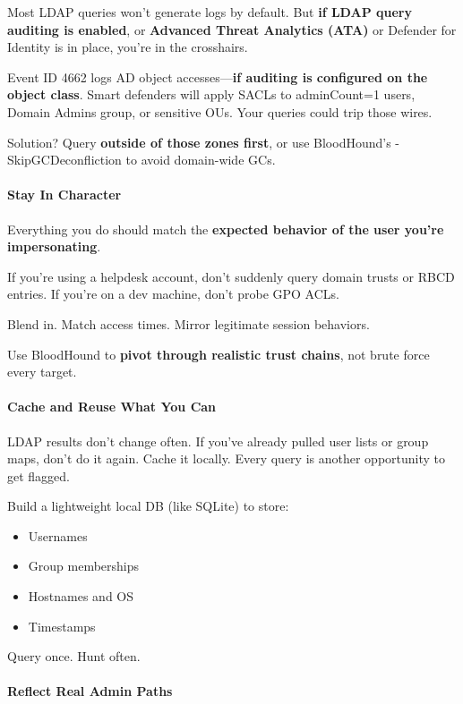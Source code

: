 Most LDAP queries won’t generate logs by default. But \textbf{if LDAP query auditing is enabled}, or \textbf{Advanced Threat Analytics (ATA)} or Defender for Identity is in place, you’re in the crosshairs.

Event ID 4662 logs AD object accesses—\textbf{if auditing is configured on the object class}. Smart defenders will apply SACLs to adminCount=1 users, Domain Admins group, or sensitive OUs. Your queries could trip those wires.

Solution? Query \textbf{outside of those zones first}, or use BloodHound’s -SkipGCDeconfliction to avoid domain-wide GCs.

\paragraph{\textbf{   Stay In Character}}

Everything you do should match the \textbf{expected behavior of the user you’re impersonating}.

If you’re using a helpdesk account, don’t suddenly query domain trusts or RBCD entries. If you’re on a dev machine, don’t probe GPO ACLs.

Blend in. Match access times. Mirror legitimate session behaviors.

Use BloodHound to \textbf{pivot through realistic trust chains}, not brute force every target.

\paragraph{\textbf{   Cache and Reuse What You Can}}

LDAP results don’t change often. If you’ve already pulled user lists or group maps, don’t do it again. Cache it locally. Every query is another opportunity to get flagged.

Build a lightweight local DB (like SQLite) to store:

\begin{itemize}
    \item Usernames
    \item Group memberships
    \item Hostnames and OS
    \item Timestamps

\end{itemize}
Query once. Hunt often.

\paragraph{\textbf{Reflect Real Admin Paths}}

